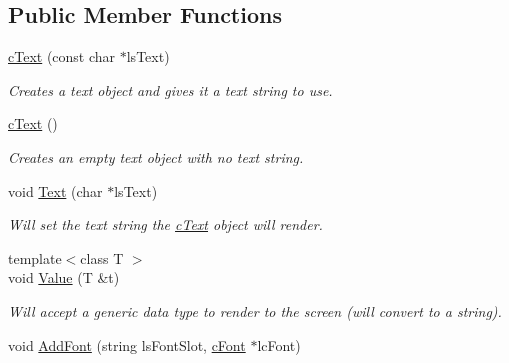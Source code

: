 \subsection*{Public Member Functions}
\begin{DoxyCompactItemize}
\item 
\hypertarget{classc_text_a22c63dd27464b40ed6e30ce5e4244334}{
\hyperlink{classc_text_a22c63dd27464b40ed6e30ce5e4244334}{cText} (const char $\ast$lsText)}
\label{classc_text_a22c63dd27464b40ed6e30ce5e4244334}

\begin{DoxyCompactList}\small\item\em Creates a text object and gives it a text string to use. \end{DoxyCompactList}\item 
\hypertarget{classc_text_a9784e9fa562a9b942a24e1dbfda0f485}{
\hyperlink{classc_text_a9784e9fa562a9b942a24e1dbfda0f485}{cText} ()}
\label{classc_text_a9784e9fa562a9b942a24e1dbfda0f485}

\begin{DoxyCompactList}\small\item\em Creates an empty text object with no text string. \end{DoxyCompactList}\item 
\hypertarget{classc_text_a7c9689bdce14d24267277a2ebdb08fdf}{
void \hyperlink{classc_text_a7c9689bdce14d24267277a2ebdb08fdf}{Text} (char $\ast$lsText)}
\label{classc_text_a7c9689bdce14d24267277a2ebdb08fdf}

\begin{DoxyCompactList}\small\item\em Will set the text string the \hyperlink{classc_text}{cText} object will render. \end{DoxyCompactList}\item 
\hypertarget{classc_text_a7f0e0136d2461e2e3682b65eb6e125cf}{
{\footnotesize template$<$class T $>$ }\\void \hyperlink{classc_text_a7f0e0136d2461e2e3682b65eb6e125cf}{Value} (T \&t)}
\label{classc_text_a7f0e0136d2461e2e3682b65eb6e125cf}

\begin{DoxyCompactList}\small\item\em Will accept a generic data type to render to the screen (will convert to a string). \end{DoxyCompactList}\item 
\hypertarget{classc_text_ac44668d1b105b37f62e5386ce9c62969}{
void \hyperlink{classc_text_ac44668d1b105b37f62e5386ce9c62969}{AddFont} (string lsFontSlot, \hyperlink{classc_font}{cFont} $\ast$lcFont)}
\label{classc_text_ac44668d1b105b37f62e5386ce9c62969}


\end{DoxyCompactItemize}
